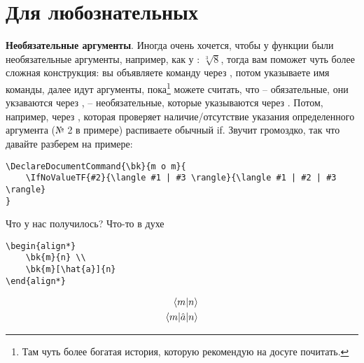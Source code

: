 \section*{Для любознательных}


\textbf{Необязательные аргументы}.
Иногда очень хочется, чтобы у функции были необязательные аргументы, например, как у : $\sqrt[3]{8}$,
тогда вам поможет чуть более сложная конструкция: вы объявляете команду через , потом указываете имя команды, далее идут аргументы, пока\footnote{
    Там чуть более богатая история, которую рекомендую на досуге почитать.
}  можете считать, что  -- обязательные, они укзаваются через ,  -- необязательные, которые указываются через \codeword{[...]}. Потом, например, через , которая проверяет наличие/отсутствие указания определенного аргумента (№ 2 в примере) распиваете обычный if. Звучит громоздко, так что давайте разберем на примере:
\begin{lstlisting}
\DeclareDocumentCommand{\bk}{m o m}{
    \IfNoValueTF{#2}{\langle #1 | #3 \rangle}{\langle #1 | #2 | #3 \rangle}
}
\end{lstlisting}
Что у нас получилось? Что-то в духе \\
\begin{minipage}{0.45\textwidth}
    \begin{lstlisting}
\begin{align*}
    \bk{m}{n} \\
    \bk{m}[\hat{a}]{n}
\end{align*}
\end{lstlisting}
\end{minipage}
\hfill
\vline
\hfill
\begin{minipage}{0.45\textwidth}
\begin{align*}
    \bk{m}{n} \\
    \bk{m}[\hat{a}]{n}
\end{align*}
\end{minipage}
